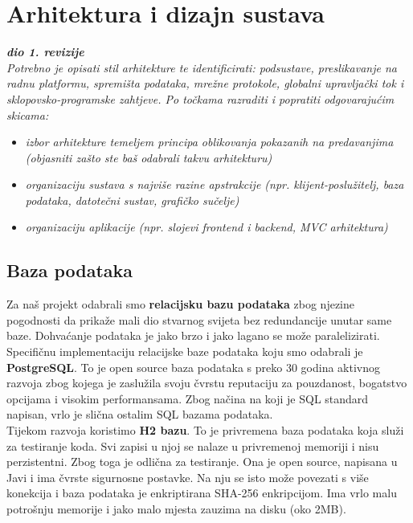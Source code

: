 \chapter{Arhitektura i dizajn sustava}
		
		\textbf{\textit{dio 1. revizije}}\\

		\textit{ Potrebno je opisati stil arhitekture te identificirati: podsustave, preslikavanje na radnu platformu, spremišta podataka, mrežne protokole, globalni upravljački tok i sklopovsko-programske zahtjeve. Po točkama razraditi i popratiti odgovarajućim skicama:}
	\begin{itemize}
		\item 	\textit{izbor arhitekture temeljem principa oblikovanja pokazanih na predavanjima (objasniti zašto ste baš odabrali takvu arhitekturu)}
		\item 	\textit{organizaciju sustava s najviše razine apstrakcije (npr. klijent-poslužitelj, baza podataka, datotečni sustav, grafičko sučelje)}
		\item 	\textit{organizaciju aplikacije (npr. slojevi frontend i backend, MVC arhitektura) }		
	\end{itemize}

	
		

		

				
		\section{Baza podataka}
			
		Za naš projekt odabrali smo \textbf{relacijsku bazu podataka} zbog njezine pogodnosti da prikaže mali dio stvarnog svijeta bez redundancije unutar same baze. Dohvaćanje podataka je jako brzo i jako lagano se može paralelizirati. Specifičnu implementaciju relacijske baze podataka koju smo odabrali je \textbf{PostgreSQL}. To je open source baza podataka s preko 30 godina aktivnog razvoja zbog kojega je zaslužila svoju čvrstu reputaciju za pouzdanost, bogatstvo opcijama i visokim performansama. Zbog načina na koji je SQL standard napisan, vrlo je slična ostalim SQL bazama podataka.\\ 
		
		Tijekom razvoja koristimo \textbf{H2 bazu}. To je privremena baza podataka koja služi za testiranje koda. Svi zapisi u njoj se nalaze u privremenoj memoriji i nisu perzistentni. Zbog toga je odlična za testiranje. Ona je open source, napisana u Javi i ima čvrste sigurnosne postavke. Na nju se isto može povezati s više konekcija i baza podataka je enkriptirana SHA-256 enkripcijom. Ima vrlo malu potrošnju memorije i jako malo mjesta zauzima na disku (oko 2MB). \\ 
		

